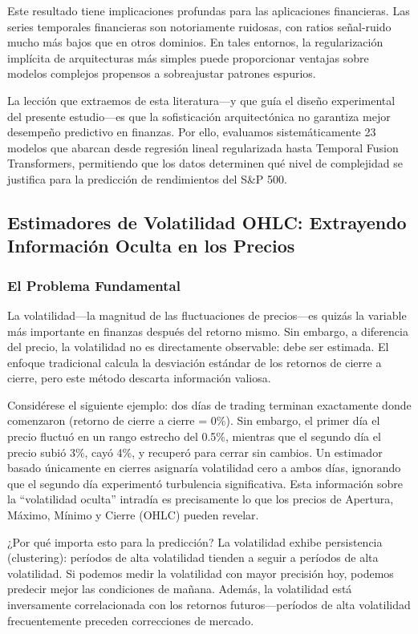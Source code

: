 \documentclass[11pt,a4paper]{article}
\begin{document}
Este resultado tiene implicaciones profundas para las aplicaciones financieras. Las series temporales financieras son notoriamente ruidosas, con ratios señal-ruido mucho más bajos que en otros dominios. En tales entornos, la regularización implícita de arquitecturas más simples puede proporcionar ventajas sobre modelos complejos propensos a sobreajustar patrones espurios.

La lección que extraemos de esta literatura---y que guía el diseño experimental del presente estudio---es que la sofisticación arquitectónica no garantiza mejor desempeño predictivo en finanzas. Por ello, evaluamos sistemáticamente 23 modelos que abarcan desde regresión lineal regularizada hasta Temporal Fusion Transformers, permitiendo que los datos determinen qué nivel de complejidad se justifica para la predicción de rendimientos del S\&P 500.

\subsection{Estimadores de Volatilidad OHLC: Extrayendo Información Oculta en los Precios}

\subsubsection{El Problema Fundamental}

La volatilidad---la magnitud de las fluctuaciones de precios---es quizás la variable más importante en finanzas después del retorno mismo. Sin embargo, a diferencia del precio, la volatilidad no es directamente observable: debe ser estimada. El enfoque tradicional calcula la desviación estándar de los retornos de cierre a cierre, pero este método descarta información valiosa.

Considérese el siguiente ejemplo: dos días de trading terminan exactamente donde comenzaron (retorno de cierre a cierre = 0\%). Sin embargo, el primer día el precio fluctuó en un rango estrecho del 0.5\%, mientras que el segundo día el precio subió 3\%, cayó 4\%, y recuperó para cerrar sin cambios. Un estimador basado únicamente en cierres asignaría volatilidad cero a ambos días, ignorando que el segundo día experimentó turbulencia significativa. Esta información sobre la ``volatilidad oculta'' intradía es precisamente lo que los precios de Apertura, Máximo, Mínimo y Cierre (OHLC) pueden revelar.

¿Por qué importa esto para la predicción? La volatilidad exhibe persistencia (clustering): períodos de alta volatilidad tienden a seguir a períodos de alta volatilidad. Si podemos medir la volatilidad con mayor precisión hoy, podemos predecir mejor las condiciones de mañana. Además, la volatilidad está inversamente correlacionada con los retornos futuros---períodos de alta volatilidad frecuentemente preceden correcciones de mercado.
\end{document}
